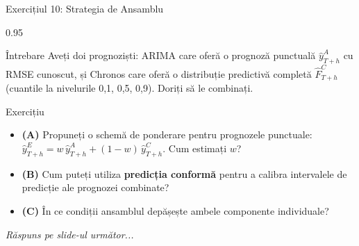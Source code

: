 \documentclass[9pt, aspectratio=169, t]{beamer}
\begin{document}
\begin{frame}{Exercițiul 10: Strategia de Ansamblu}
    \begin{cminipage}{0.95\textwidth}
    \begin{alertblock}{Întrebare}
        Aveți doi prognoziști: ARIMA care oferă o prognoză punctuală $\hat{y}^{A}_{T+h}$ cu RMSE cunoscut, și Chronos care oferă o distribuție predictivă completă $\hat{F}^{C}_{T+h}$ (cuantile la nivelurile 0,1, 0,5, 0,9). Doriți să le combinați.
    \end{alertblock}

    \vspace{0.15cm}

    \begin{block}{Exercițiu}
        \begin{itemize}\setlength{\itemsep}{3pt}
            \item \textcolor{MainBlue}{\textbf{(A)}} Propuneți o schemă de ponderare pentru prognozele punctuale: $\hat{y}^{E}_{T+h} = w\,\hat{y}^{A}_{T+h} + (1-w)\,\hat{y}^{C}_{T+h}$. Cum estimați $w$?
            \item \textcolor{MainBlue}{\textbf{(B)}} Cum puteți utiliza \textbf{predicția conformă} pentru a calibra intervalele de predicție ale prognozei combinate?
            \item \textcolor{MainBlue}{\textbf{(C)}} În ce condiții ansamblul depășește ambele componente individuale?
        \end{itemize}
    \end{block}

    \vspace{0.15cm}

    \begin{center}
        \textit{Răspuns pe slide-ul următor...}
    \end{center}
    \end{cminipage}
\end{frame}
\end{document}
